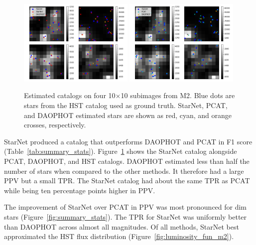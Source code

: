 \begin{figure}[tb]
    \centering
    \includegraphics[width=0.49\textwidth]{figures/m2_results/example_subimages_starnet.png}
    \includegraphics[width=0.49\textwidth]{figures/m2_results/example_subimages_pcat.png}
    \caption{Estimated catalogs on four 10$\times$10 subimages from
    M2. Blue dots are stars from the HST catalog used as ground truth.
    StarNet, PCAT, and DAOPHOT estimated stars are shown as
    red, cyan, and orange crosses, respectively. }
    \label{fig:example_subimages}
\end{figure}

StarNet produced a catalog that outperforms DAOPHOT and PCAT in F1 score (Table~\ref{tab:summary_stats}).
Figure~\ref{fig:example_subimages} shows the StarNet catalog alongside PCAT, DAOPHOT, and HST catalogs.
DAOPHOT estimated less than half the number of stars when compared to the other methods.
It therefore had a large PPV but a small TPR.
The StarNet catalog had about the same TPR as PCAT while being ten percentage points higher in PPV.

The improvement of StarNet over PCAT in PPV was most pronounced for dim stars (Figure~\ref{fig:summary_stats}).
The TPR for StarNet was uniformly better than DAOPHOT across almost all magnitudes.
Of all methods, StarNet best approximated the HST flux distribution (Figure~\ref{fig:luminosity_fun_m2}).

